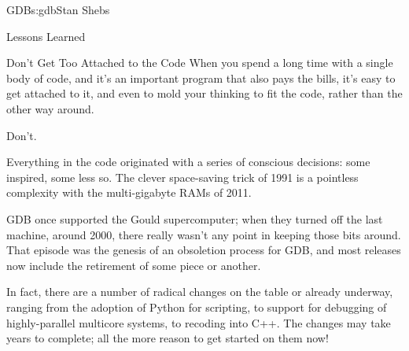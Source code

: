 \begin{aosachapter}{GDB}{s:gdb}{Stan Shebs}
\begin{aosasect1}{Lessons Learned}
\begin{aosasect2}{Don't Get Too Attached to the Code}
When you spend a long time with a single body of code, and it's an
important program that also pays the bills, it's easy to get attached
to it, and even to mold your thinking to fit the code, rather than the
other way around.

Don't.

Everything in the code originated with a series of conscious
decisions: some inspired, some less so.  The clever space-saving trick
of 1991 is a pointless complexity with the multi-gigabyte RAMs of
2011.

GDB once supported the Gould supercomputer; when they turned off the
last machine, around 2000, there really wasn't any point in keeping
those bits around.  That episode was the genesis of an obsoletion
process for GDB, and most releases now include the retirement of
some piece or another.

In fact, there are a number of radical changes on the table or already
underway, ranging from the adoption of Python for scripting, to
support for debugging of highly-parallel multicore systems, to
recoding into C++.  The changes may take years to complete; all the
more reason to get started on them now!

\end{aosasect2}

\end{aosasect1}

\end{aosachapter}
